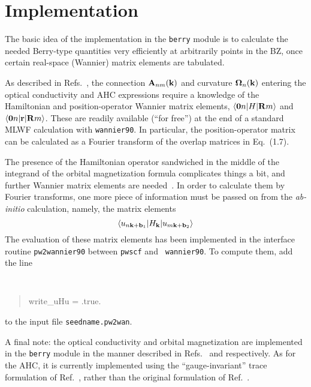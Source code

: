 \section{Implementation}

The basic idea of the implementation in the {\tt berry} module is to
calculate the needed Berry-type quantities very efficiently at
arbitrarily points in the BZ, once certain real-space (Wannier) matrix
elements are tabulated.

As described in Refs.~\cite{wang-prb06,yates-prb07}, the connection
${\bf A}_{nm}({\bf k})$ and curvature $\bm{\Omega}_n({\bf k})$
entering the optical conductivity and AHC expressions require a
knowledge of the Hamiltonian and position-operator Wannier matrix
elements, $\langle {\bf 0}n\vert H\vert {\bf R}m\rangle$ and $\langle
{\bf 0}n\vert {\bf r}\vert {\bf R}m\rangle$.  These are readily
available (``for free'') at the end of a standard MLWF calculation
with {\tt wannier90}. In particular, the position-operator matrix can
be calculated as a Fourier transform of the overlap matrices in
Eq.~(1.7).

The presence of the Hamiltonian operator sandwiched in the middle of
the integrand of the orbital magnetization formula complicates things
a bit, and further Wannier matrix elements are
needed~\cite{lopez-prb12}. In order to calculate them by Fourier
transforms, one more piece of information must be passed on from the
{\it ab-initio} calculation,
namely, the matrix elements
%
$$\langle u_{n{\bf k}+{\bf b}_1}\vert
H_{\bf k}\vert u_{m{\bf k}+{\bf b}_2}\rangle
$$
%
%
The evaluation of these matrix elements has been implemented in the
interface routine {\tt pw2wannier90} between {\tt pwscf} and {\tt
  wannier90}. To compute them, add the line
%
{\tt
\begin{quote}
write\_uHu = .true.
\end{quote}
}
%
to the input file {\tt seedname.pw2wan}.

A final note: the optical conductivity and orbital magnetization are
implemented in the {\tt berry} module in the manner described in
Refs.~\cite{yates-prb07} and \cite{lopez-prb12} respectively. As for
the AHC, it is currently implemented using the ``gauge-invariant''
trace formulation of Ref.~\cite{lopez-prb12}, rather than the original
formulation of Ref.~\cite{wang-prb06}.
